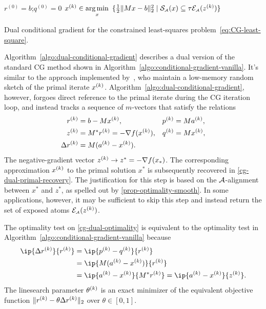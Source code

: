 \begin{algorithm}[t]
  \DontPrintSemicolon\setcounter{AlgoLine}{-1}
  $r^{(0)}=b$;\enspace $q^{(0)}=0$\; 
  $x^{(k)} \in
  \underset{x}{\textrm{arg}\,{\min}}\enskip \{\frac{1}{2}\|Mx - b\|_2^2 \mid \operatorname{\mathcal{S}_{\scriptscriptstyle\mathcal{A}}}(x) \subseteq
    \tau\mathcal{E}_{\scriptscriptstyle\mathcal{A}}(z^{(k)})\}$\label{cg-dual-primal-recovery}\;
  \;
  \caption{Dual conditional gradient for the constrained least-squares problem~\eqref{eq:CG-least-square}.\label{algo:dual-conditional-gradient}}
\end{algorithm}

Algorithm~\ref{algo:dual-conditional-gradient} describes a dual version of the standard
CG method shown in Algorithm~\ref{algo:conditional-gradient-vanilla}. It's similar to the
approach implemented by~\citet{yurtsever2017sketchy}, who maintain a low-memory
random sketch of the primal iterate $x^{(k)}$.
Algorithm~\ref{algo:dual-conditional-gradient}, however, forgoes direct reference to the
primal iterate during the CG iteration loop, and instead tracks a sequence of
$m$-vectors that satisfy the relations
\begin{align*}
   r^{(k)} &= b - Mx^{(k)},               &   p^{(k)} &= Ma^{(k)},
\\ z^{(k)} &= M^*r^{(k)}=-\nabla f(x^{(k)}),  &   q^{(k)} &= Mx^{(k)},
\\ \Delta r^{(k)} &= M(a^{(k)}-x^{(k)}).
\end{align*}
The negative-gradient vector $z^{(k)} \to z^* = -\nabla f(x_*)$. The
corresponding approximation $x^{(k)}$ to the primal solution $x^*$ is subsequently
recovered in \autoref{cg-dual-primal-recovery}. The justification for this step is
based on the $\mathcal{A}$-alignment between $x^*$ and $z^*$, as spelled out by
\autoref{prop-optimality-smooth}. In some applications, however, it may be
sufficient to skip this step and instead return the set of exposed atoms
$\mathcal{E}_{\scriptscriptstyle\mathcal{A}}(z^{(k)})$.

The optimality test on \autoref{cg-dual-optimality} is equivalent to the optimality
test in Algorithm~\ref{algo:conditional-gradient-vanilla} because
\begin{align*}
  \ip{\Delta r\k}{r\k}
  &= \ip{p\k - q\k}{r\k}
\\&= \ip{M(a\k - x\k)}{r\k}
\\&=\ip{a\k-x\k}{M^*r\k} = \ip{a\k-x\k}{z\k}.
\end{align*}
The linesearch parameter $\theta^{(k)}$ is an exact minimizer of the equivalent
objective function $\|r^{(k)}-\theta\Delta r^{(k)}\|_2$ over $\theta \in [0, 1]$.

